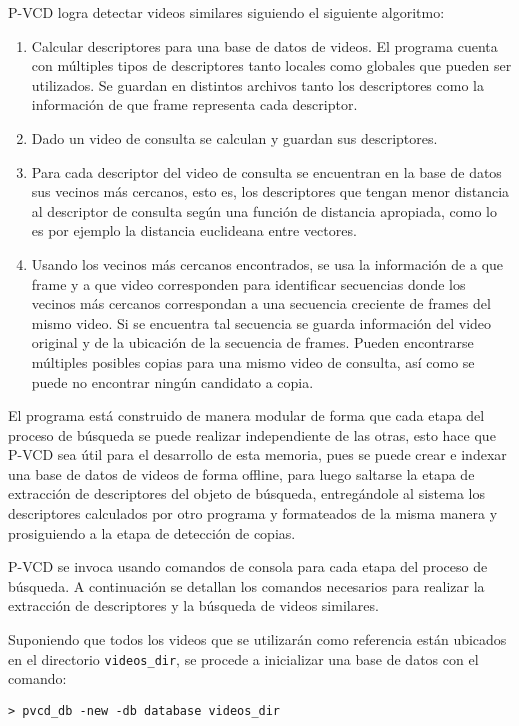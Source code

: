 P-VCD logra detectar videos similares siguiendo el siguiente algoritmo:
\begin{enumerate}
\item Calcular descriptores para una base de datos de videos. El programa cuenta con múltiples tipos de descriptores tanto locales como globales que pueden ser utilizados. Se guardan en distintos archivos tanto los descriptores como la información de que frame representa cada descriptor.
\item Dado un video de consulta se calculan y guardan sus descriptores.
\item Para cada descriptor del video de consulta se encuentran en la base de datos sus vecinos más cercanos, esto es, los descriptores que tengan menor distancia al descriptor de consulta según una función de distancia apropiada, como lo es por ejemplo la distancia euclideana entre vectores.
\item Usando los vecinos más cercanos encontrados, se usa la información de a que frame y a que video corresponden para identificar secuencias donde los vecinos más cercanos correspondan a una secuencia creciente de frames del mismo video. Si se encuentra tal secuencia se guarda información del video original y de la ubicación de la secuencia de frames. Pueden encontrarse múltiples posibles copias para una mismo video de consulta, así como se puede no encontrar ningún candidato a copia. 
\end{enumerate}

El programa está construido de manera modular de forma que cada etapa del proceso de búsqueda se puede realizar independiente de las otras, esto hace que P-VCD sea útil para el desarrollo de esta memoria, pues se puede crear e indexar una base de datos de videos de forma offline, para luego saltarse la etapa de extracción de descriptores del objeto de búsqueda, entregándole al sistema los descriptores calculados por otro programa y formateados de la misma manera y prosiguiendo a la etapa de detección de copias.

P-VCD se invoca usando comandos de consola para cada etapa del proceso de búsqueda. A continuación se detallan los comandos necesarios para realizar la extracción de descriptores y la búsqueda de videos similares.

Suponiendo que todos los videos que se utilizarán como referencia están ubicados en el directorio \texttt{videos\_dir}, se procede a inicializar una base de datos con el comando:
\begin{lstlisting}[style=BashInputStyle]
    > pvcd_db -new -db database videos_dir
\end{lstlisting}

